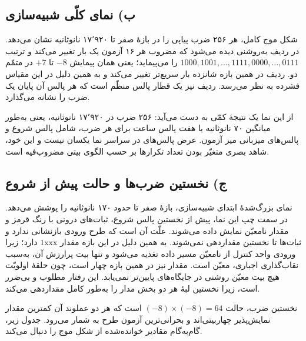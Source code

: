 \documentclass[12pt,a4paper]{article}
\begin{document}
	\subsection*{ب) نمای کلّی شبیه‌سازی}
	شکل موج کامل، هر ۲۵۶ ضرب پیاپی را در بازهٔ صفر تا ۱۷٬۹۲۰ نانوثانیه نشان می‌دهد. در ردیف  به‌روشنی دیده می‌شود که مضروب هر ۱۶ آزمون یک بار تغییر می‌کند و ترتیب \(1000,1001,\dots,1111,0000,\dots,0111\) را می‌پیماید؛ یعنی همان پیمایش \(-8\) تا \(+7\) در متمّم دو. ردیف  در همین بازه شانزده بار سریع‌تر تغییر می‌کند و به همین دلیل در این مقیاس فشرده به نظر می‌رسد. ردیف  نیز یک قطار پالس منظّم است که هر پالس آن پایان یک ضرب را نشانه می‌گذارد.

	از این نما یک نتیجهٔ کمّی به دست می‌آید: ۲۵۶ ضرب در ۱۷٬۹۲۰ نانوثانیه، یعنی به‌طور میانگین ۷۰ نانوثانیه یا هفت پالس ساعت برای هر ضرب، شامل پالس شروع و پالس‌های میزبانی میز آزمون. عرض پالس‌های  در سراسر نما یکسان نیست و این خود، شاهد بصری متغیّر بودن تعداد تکرارها بر حسب الگوی بیتی مضروب‌فیه است.


	\subsection*{ج) نخستین ضرب‌ها و حالت پیش از شروع}
	نمای بزرگ‌شدهٔ ابتدای شبیه‌سازی، بازهٔ صفر تا حدود ۱۷۰ نانوثانیه را پوشش می‌دهد. در سمت چپ این نما، پیش از نخستین پالس شروع، ثبات‌های درونی با رنگ قرمز و مقدار نامعیّن نمایش داده می‌شوند. علّت آن است که طرح ورودی بازنشانی ندارد و ثبات‌ها تا نخستین  مقداردهی نمی‌شوند. به همین دلیل  در این بازه مقدار \(1\text{xxx}\) دارد؛ زیرا ورودی  واحد کنترل از  نامعیّن مسیر داده تغذیه می‌شود و تنها بیت پرارزش آن، به‌سبب نقاب‌گذاری اجباری، معیّن است. مقدار  نیز در همین بازه چهار است، چون حلقهٔ اولویّت هیچ بیت معیّن روشنی در جایگاه‌های پایین‌تر نمی‌یابد. این رفتار مطلوب و بی‌ضرر است، زیرا نخستین لبهٔ  هر دو بخش مدار را به‌طور کامل مقداردهی می‌کند.


	نخستین ضرب، حالت \((-8)\times(-8)=64\) است که هر دو عملوند آن کمترین مقدار نمایش‌پذیر چهاربیتی‌اند و بحرانی‌ترین آزمون طرح به شمار می‌رود. جدول زیر، گام‌به‌گام مقادیر خوانده‌شده از شکل موج را دنبال می‌کند.
\end{document}
